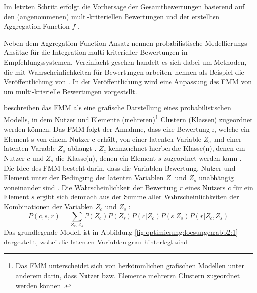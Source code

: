Im letzten Schritt erfolgt die Vorhersage der Gesamtbewertungen basierend auf den (angenommenen) multi-kriteriellen Bewertungen und der erstellten Aggregation-Function $f$ \cite[S. 861]{adomavicius:4:inbook}.

Neben dem Aggregation-Function-Ansatz nennen \textcite[S. 861]{adomavicius:4:inbook} probabilistische Modellierungs-Ansätze für die Integration multi-kriterieller Bewertungen in Empfehlungssystemen.
Vereinfacht gesehen handelt es sich dabei um Methoden, die mit Wahrscheinlichkeiten für Bewertungen arbeiten.
\textcite[S. 861]{adomavicius:4:inbook} nennen als Beispiel die Veröffentlichung von \textcite[S. 231]{sahoo:article}.
In der Veröffentlichung wird eine Anpassung des \ac{FMM} von \textcite[S. 704ff.]{si:inproceedings} um multi-krierielle Bewertungen vorgestellt.

\textcite[S. 358]{jin:article} beschreiben das \ac{FMM} als eine grafische Darstellung eines probabilistischen Modells, in dem Nutzer und Elemente (mehreren)\footnote{Das \ac{FMM} unterscheidet sich von herkömmlichen grafischen Modellen unter anderem darin, dass Nutzer bzw. Elemente mehreren Clustern zugeordnet werden können \cite[S. 3]{si:inproceedings}\cite[S. 366]{jin:article}.} Clustern (Klassen) zugeordnet werden können.
Das \ac{FMM} folgt der Annahme, dass eine Bewertung r, welche ein Element s von einem Nutzer c erhält, von einer latenten Variable $Z_{c}$ und einer latenten Variable $Z_{s}$ abhängt \cite[S. 235]{sahoo:article}.
$Z_{c}$ kennzeichnet hierbei die Klasse(n), denen ein Nutzer $c$ und ${Z_{s}}$ die Klasse(n), denen ein Element $s$ zugeordnet werden kann \cite[S. 862]{adomavicius:4:inbook}\cite[S. 3]{si:inproceedings}.
Die Idee des \ac{FMM} besteht darin, dass die Variablen Bewertung, Nutzer und Element unter der Bedingung der latenten Variablen $Z_{c}$ und $Z_{s}$ unabhängig voneinander sind \cite[S. 4]{sahoo:2:article}\cite[S. 235]{sahoo:article}.
Die Wahrscheinlichkeit der Bewertung $r$ eines Nutzers $c$ für ein Element $s$ ergibt sich demnach aus der Summe aller Wahrscheinlichkeiten der Kombinationen der Variablen $Z_{c}$ und $Z_{s}$ \cite[S. 862]{adomavicius:4:inbook}:
\begin{equation}\label{eq24}
    P(c,s,r) = \sum\limits_{Z_{c}, Z_{s}}P(Z_{c})P(Z_{s})P(c|Z_{c})P(s|Z_{s})P(r|Z_{c},Z_{s})
\end{equation}
Das grundlegende Modell ist in Abbildung \ref{fig:optimierung:loesungen:abb2:1} dargestellt, wobei die latenten Variablen grau hinterlegt sind.

